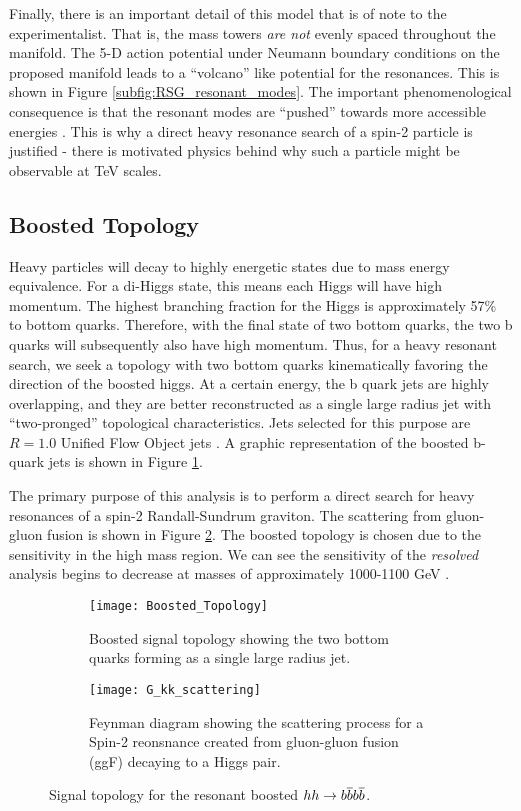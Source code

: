 \documentclass[12pt]{article}
\begin{document}
Finally, there is an important detail of this model that is of note to the
experimentalist. That is, the mass towers \textit{are not} evenly spaced
throughout the manifold. The 5-D action potential under Neumann boundary
conditions on the proposed manifold leads to a ``volcano'' like potential for
the resonances. This is shown in Figure \ref{subfig:RSG_resonant_modes}. The
important phenomenological consequence is that the resonant modes are ``pushed''
towards more accessible energies \cite{RandallSundrumOriginal, bsm}. This is why
a direct heavy resonance search of a spin-2 particle is justified - there is
motivated physics behind why such a particle might be observable at TeV scales.

\subsection{Boosted Topology}
Heavy particles will decay to highly energetic states due to mass energy
equivalence. For a di-Higgs state, this means each Higgs will have high
momentum. The highest branching fraction for the Higgs is approximately 57\% to
bottom quarks. Therefore, with the final state of two bottom quarks, the two b
quarks will subsequently also have high momentum. Thus, for a heavy resonant
search, we seek a topology with two bottom quarks kinematically favoring the
direction of the boosted higgs. At a certain energy, the b quark jets are highly
overlapping, and they are better reconstructed as a single large radius jet with
``two-pronged'' topological characteristics. Jets selected for this purpose are
$R=1.0$ Unified Flow Object jets \cite{boosted_hbbcc_tagger, large_r_jet}. A
graphic representation of the boosted b-quark jets is shown in Figure
\ref{subfig:boosted_topology}. 

The primary purpose of this analysis is to perform a direct search for heavy
resonances of a spin-2 Randall-Sundrum graviton. The scattering from gluon-gluon
fusion is shown in Figure \ref{subfig:feynman}. The boosted topology is chosen
due to the sensitivity in the high mass region. We can see the sensitivity of
the \textit{resolved} analysis begins to decrease at masses of approximately
1000-1100 GeV \cite{atlas_resonant_2022}. 


\begin{figure}[t!]
    \centering
    \begin{subfigure}[t]{.48\textwidth}
        \centering
        \texttt{[image: Boosted\_Topology]}
        \caption{Boosted signal topology showing the two bottom quarks forming as a single large radius jet.}
        \label{subfig:boosted_topology}
    \end{subfigure}
    \hfill
    \begin{subfigure}[t]{.48\textwidth}
        \centering
        \texttt{[image: G\_kk\_scattering]}
        \caption{Feynman diagram showing the scattering process for a Spin-2
        reonsnance created from gluon-gluon fusion (ggF) decaying to a Higgs pair.}
        \label{subfig:feynman}
    \end{subfigure}
    \caption{Signal topology for the resonant boosted $hh\rightarrow b\overline{b}b\overline{b}$.}
\label{fig:signal_topologies}
\end{figure}
\end{document}

